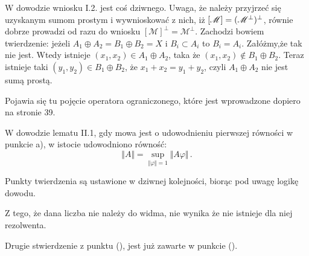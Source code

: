 \documentclass[a4paper,11pt]{article}
\numberwithin{equation}{section}
\begin{document}
\VerSpaceFour




\noindent
{} W dowodzie wniosku I.2. jest coś dziwnego. Uwaga, że
należy przyjrzeć się uzyskanym sumom prostym i wywnioskować z nich,
iż $[ \mathcal{M} ]=( \mathcal{M}^{ \bot } )^{ \bot }$, równie
dobrze prowadzi od razu do wniosku
$[ \mathcal{ M } ]^{ \bot } = \mathcal{ M }^{ \bot }$. Zachodzi
bowiem twierdzenie: jeżeli
$A_{ 1 } \oplus A_{ 2 } = B_{ 1 } \oplus B_{ 2 } = X$ i
$B_{ i } \subset A_{ i }$ to $B_{ i } = A_{ i }$. Załóżmy,że tak nie
jest. Wtedy istnieje
$( x_{ 1 }, x_{ 2 } ) \in A_{ 1 } \oplus A_{ 2 }$, taka że
$( x_{ 1 }, x_{ 2 } ) \notin B_{ 1 } \oplus B_{ 2 }$. Teraz istnieje
taki $( y_{ 1 }, y_{ 2 } ) \in B_{ 1 } \oplus B_{ 2 }$, że
$x_{ 1 } + x_{ 2 } = y_{ 1 } + y_{ 2 }$, czyli
$A_{ 1 } \oplus A_{ 2 }$ nie jest sumą prostą.

\VerSpaceFour





\noindent
{} Pojawia się tu pojęcie operatora ograniczonego, które
jest wprowadzone dopiero na stronie 39.

\VerSpaceFour





\noindent
{} W dowodzie lematu II.1, gdy mowa jest o udowodnieniu
pierwszej równości w punkcie a), w istocie udowodniono równość:
\begin{equation}
  \label{eq:GrabowskiIngarden-01}
  \Vert A \Vert = \sup_{ \Vert \varphi \Vert = 1 } \Vert A \varphi \Vert \, .
\end{equation}

\VerSpaceFour





\noindent
{} Punkty twierdzenia są ustawione w dziwnej kolejności,
biorąc pod uwagę logikę dowodu.

\VerSpaceFour





\noindent
{} Z tego, że dana liczba nie należy do widma, nie wynika
że nie istnieje dla niej rezolwenta.

\VerSpaceFour





\noindent
{} Drugie stwierdzenie z punktu (), jest już
  zawarte w punkcie ().

\VerSpaceFour
\end{document}
